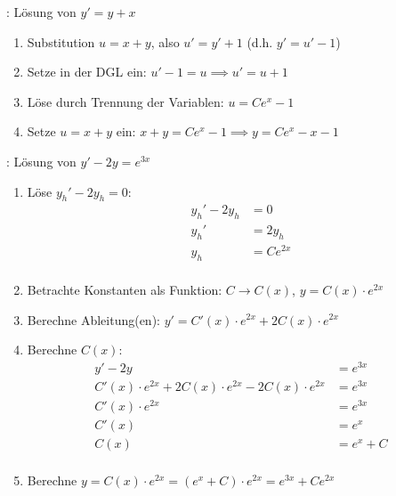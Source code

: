 \begin{minipage}{\linewidth}
\Bsp {}: Lösung von $y' = y + x$
\begin{enumerate}
    \item Substitution $u = x + y$, also $u' = y' + 1$ (d.h. $y' = u' - 1$)
    \item Setze in der DGL ein: $u' - 1 = u \implies u' = u + 1$
    \item Löse durch Trennung der Variablen: $u = Ce^x - 1$
    \item Setze $u = x + y$ ein: $x + y = Ce^x - 1 \implies y = Ce^x - x - 1$
\end{enumerate}
\end{minipage}

\begin{minipage}{\linewidth}
\Bsp {}: Lösung von $y' - 2y = e^{3x}$
\begin{enumerate}
    \item Löse $y_h' - 2y_h = 0$:
        \begin{align*}
            y_h' - 2y_h &= 0 \\[-0.6em]
            y_h' &= 2y_h \\[-0.6em]
            y_h &= Ce^{2x} \\[-0.6em]
        \end{align*}
    \item Betrachte Konstanten als Funktion: $C \to C(x)$, $y = C(x) \cdot e^{2x}$
    \item Berechne Ableitung(en): $y' = C'(x) \cdot e^{2x} + 2 C(x) \cdot e^{2x}$
    \item Berechne $C(x)$:
        \vspace{-0.6em}
        \begin{align*}
            y' - 2y &= e^{3x} \\[-0.6em]
            C'(x) \cdot e^{2x} + 2 C(x) \cdot e^{2x} - 2C(x) \cdot e^{2x} &= e^{3x} \\[-0.6em]
            C'(x) \cdot e^{2x} &= e^{3x} \\[-0.6em]
            C'(x) &= e^x \\[-0.6em]
            C(x) &= e^x + C \\[-0.6em]
        \end{align*}
    \item Berechne $y = C(x) \cdot e^{2x} = (e^x + C) \cdot e^{2x} = e^{3x} + Ce^{2x}$
\end{enumerate}
\end{minipage}

